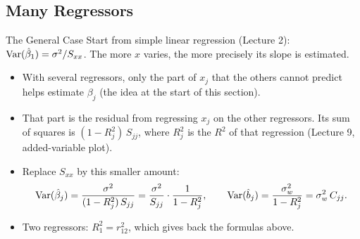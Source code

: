 \subsection{Many Regressors}


\begin{frame}{The General Case}
    Start from simple linear regression (Lecture 2): $\operatorname{Var}(\hat\beta_1)=\sigma^2/S_{xx}$. The more $x$ varies, the more precisely its slope is estimated.
    \begin{itemize}
        \item With several regressors, only the part of $x_j$ that the others cannot predict helps estimate $\beta_j$ (the idea at the start of this section).
        \item That part is the residual from regressing $x_j$ on the other regressors. Its sum of squares is $(1-R_j^2)\,S_{jj}$, where $R_j^2$ is the $R^2$ of that regression (Lecture 9, added-variable plot).
        \item Replace $S_{xx}$ by this smaller amount:
        \[
        \operatorname{Var}(\hat\beta_j)=\frac{\sigma^2}{(1-R_j^2)\,S_{jj}}=\frac{\sigma^2}{S_{jj}}\cdot\frac{1}{1-R_j^2},
        \qquad
        \operatorname{Var}(\hat b_j)=\frac{\sigma_w^2}{1-R_j^2}=\sigma_w^2\,C_{jj}.
        \]
        \item Two regressors: $R_1^2=r_{12}^2$, which gives back the formulas above.
    \end{itemize}
\end{frame}






